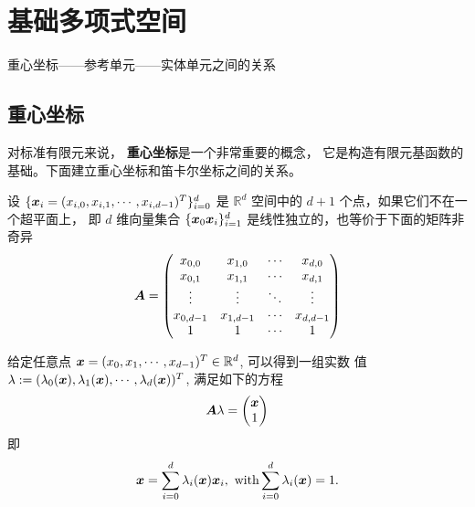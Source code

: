 \chapter{基础多项式空间} \label{Chap:Numerical methods}
重心坐标——参考单元——实体单元之间的关系

\section{重心坐标}
对标准有限元来说， {\bf 重心坐标}是一个非常重要的概念， 它是构造有限元基函数的基础。下面建立重心坐标和笛卡尔坐标之间的关系。

设 $\{{\boldsymbol x}_i = (x_{i,0}, x_{i, 1}, \cdots, x_{i, d-1})^T\}_{i=0}^{d}$ 是 $\mathbb
R^d$ 空间中的 $d+1$ 个点，如果它们不在一个超平面上， 即 $d$ 维向量集合
$\{{\boldsymbol x}_0{\boldsymbol x}_i\}_{i=1}^d$ 是线性独立的，也等价于下面的矩阵非奇异
\begin{equation}
	{\boldsymbol A} =\begin{pmatrix}
		x_{0, 0} & x_{1, 0} & \cdots & x_{d, 0} \\
		x_{0, 1} & x_{1, 1} & \cdots & x_{d, 1} \\
		\vdots   & \vdots   & \ddots & \vdots \\
		x_{0, d-1} & x_{1, d-1} & \cdots & x_{d, d-1}\\
		1 & 1 & \cdots & 1
	\end{pmatrix}
\end{equation}


给定任意点 ${\boldsymbol x}=(x_0, x_1, \cdots, x_{d-1})^T\in \mathbb R^d$, 可以得到一组实数
值 $\lambda := (\lambda_0({\boldsymbol x}), \lambda_1({\boldsymbol x}), \cdots, \lambda_d({\boldsymbol x}))^T$, 满足如下的方程
\begin{equation}
	{\boldsymbol A} \lambda=
	\begin{pmatrix}
		{\boldsymbol x} \\ 1
	\end{pmatrix}
	\label{eq:lbc}
\end{equation}
即
\begin{equation}
	{\boldsymbol x} = \sum\limits_{i=0}^{d}\lambda_i({\boldsymbol x}) {\boldsymbol x}_i,
	\text{ with} \sum\limits_{i=0}^{d}\lambda_i({\boldsymbol x}) = 1.
\end{equation}

